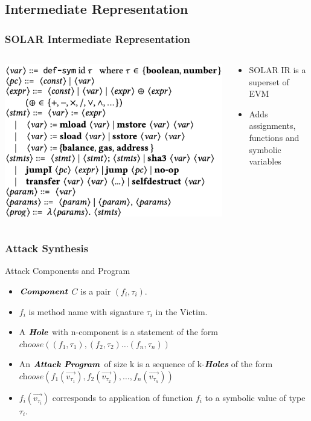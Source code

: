 \documentclass{beamer}
\newcommand{\hole}{\textit{choose}}
\newcommand{\boldIt}[1]{\textbf{\textit{#1}}}
\newcommand{\vect}[1]{\overrightarrow{#1}}
\begin{document}
\subsection{Intermediate Representation}
\begin{frame}
  \frametitle{SOLAR Intermediate Representation}
  \begin{columns}[T]
    \begin{column}{0.5\textwidth}
      \includegraphics[scale=0.35]{IRGrammar}
    \end{column}
    \pause
    \begin{column}{0.5\textwidth}
      \begin{itemize}
      \item SOLAR IR is a superset of EVM
      \item Adds assignments, functions and symbolic
        variables
      \end{itemize}
    \end{column}
  \end{columns}
\end{frame}


\begin{frame}[fragile]
  \frametitle{Attack Synthesis}
  \begin{block}{Attack Components and Program}
    \begin{itemize}
      \item $\boldIt{Component}$ $C$ is a pair $(f_i, \tau_i)$.
      \item $f_i$ is method name with signature $\tau_i$ in the Victim.
      \item A $\boldIt{Hole}$ with n-component is a statement of the form
        $\hole((f_1, \tau_1), (f_2, \tau_2) \dots (f_n, \tau_n))$
      \item An $\boldIt{Attack Program}$ of size k is a sequence of
        k-\boldIt{Holes} of the form $\hole(f_1(\vect{v_{\tau_1}}),
        f_2(\vect{v_{\tau_2}}), \dots, f_n(\vect{v_{\tau_n}}))$
      \item $f_i(\vect{v_{\tau_i}})$ corresponds to application of
        function $f_i$ to a symbolic value of type $\tau_i$.
    \end{itemize}
  \end{block}
\end{frame}
\end{document}
